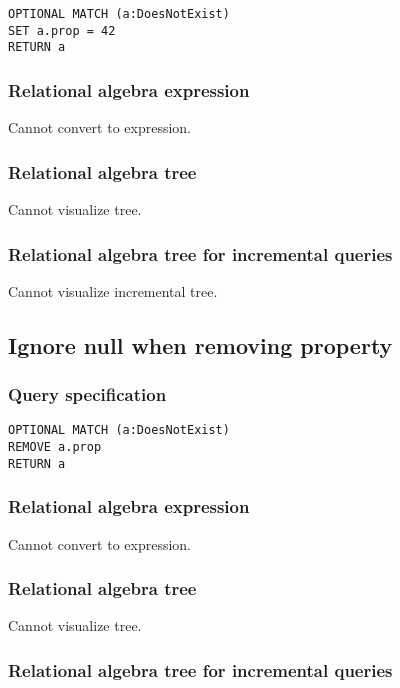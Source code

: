 \begin{lstlisting}
OPTIONAL MATCH (a:DoesNotExist)
SET a.prop = 42
RETURN a
\end{lstlisting}

\subsubsection*{Relational algebra expression}

Cannot convert to expression.

\subsubsection*{Relational algebra tree}

Cannot visualize tree.

\subsubsection*{Relational algebra tree for incremental queries}

Cannot visualize incremental tree.

\subsection{Ignore null when removing property}

\subsubsection*{Query specification}

\begin{lstlisting}
OPTIONAL MATCH (a:DoesNotExist)
REMOVE a.prop
RETURN a
\end{lstlisting}

\subsubsection*{Relational algebra expression}

Cannot convert to expression.

\subsubsection*{Relational algebra tree}

Cannot visualize tree.

\subsubsection*{Relational algebra tree for incremental queries}

